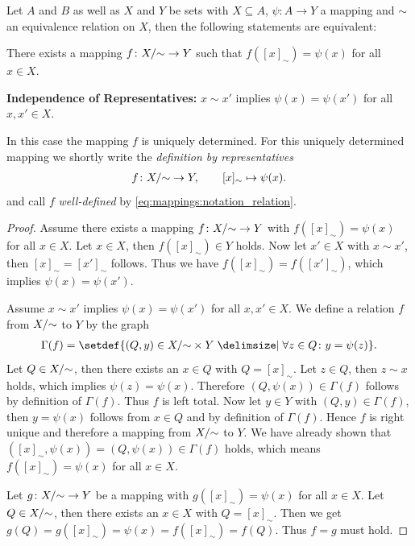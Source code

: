 \begin{theorem}\label{theorem:mappings:well_defined_relation}
    Let $A$ and $B$ as well as $X$ and $Y$ be sets with $X\subseteq A$, $\psi\colon A\rightarrow Y$ a mapping and $\sim$ an equivalence relation on $X$, then the following statements are equivalent:
    \begin{intheoremenumerate}
        \item There exists a mapping $f\colon {X}/{\sim} \rightarrow Y$ such that $f([x]_\sim)=\psi(x)$ for all $x\in X$.
        \item\textbf{Independence of Representatives:} $x\sim x'$ implies $\psi(x)=\psi(x')$ for all $x,x'\in X$.
    \end{intheoremenumerate}
    In this case the mapping $f$ is uniquely determined. For this uniquely determined mapping we shortly write the \emph{definition by representatives}
    \begin{align}f\colon {X}/{\sim} \rightarrow Y,\qquad [x]_\sim\mapsto \psi(x).\label{eq:mappings:notation_relation}\end{align}
    and call $f$ \emph{well-defined} by \eqref{eq:mappings:notation_relation}.
\end{theorem}

\begin{proof}
     Assume there exists a mapping $f\colon {X}/{\sim} \rightarrow Y$ with $f([x]_\sim)=\psi(x)$ for all $x\in X$. Let $x\in X$, then $f([x]_\sim)\in Y$ holds. Now let $x'\in X$ with $x\sim x'$, then $[x]_\sim=[x']_\sim$ follows. Thus we have $f([x]_\sim)=f([x']_\sim)$, which implies $\psi(x)=\psi(x')$.

     Assume $x\sim x'$ implies $\psi(x)=\psi(x')$ for all $x,x'\in X$. We define a relation $f$ from ${X}/{\sim}$ to $Y$ by the graph \begin{align}\Gamma(f)=\setdef{(Q,y)\in \quoset X \sim \times Y \given \forall z\in Q\colon y=\psi(z)}.\end{align}
    Let $Q\in {X}/{\sim}$, then there exists an $x\in Q$ with $Q=[x]_\sim$. Let $z\in Q$, then $z\sim x$ holds, which implies $\psi(z)=\psi(x)$. Therefore $(Q,\psi(x))\in\Gamma(f)$ follows by definition of $\Gamma(f)$. Thus $f$ is left total. Now let $y\in Y$ with $(Q,y)\in\Gamma(f)$, then $y=\psi(x)$ follows from $x\in Q$ and by definition of $\Gamma(f)$. Hence $f$ is right unique and therefore a mapping from ${X}/{\sim}$ to $Y$. We have already shown that $([x]_\sim,\psi(x))=(Q,\psi(x))\in\Gamma(f)$ holds, which means $f([x]_\sim)=\psi(x)$ for all $x\in X$.

     Let $g\colon {X}/{\sim} \rightarrow Y$ be a mapping with $g([x]_\sim)=\psi(x)$ for all $x\in X$. Let $Q\in{X}/{\sim}$, then there exists an $x\in X$ with $Q=[x]_\sim$. Then we get $g(Q)=g([x]_\sim)=\psi(x)=f([x]_\sim)=f(Q)$. Thus $f=g$ must hold.
\end{proof}


